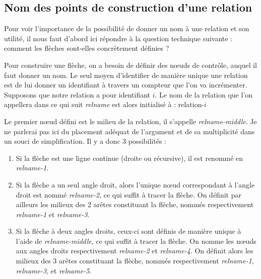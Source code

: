 \documentclass[a4paper,11pt]{report}
\newcommand{\inputTikZ}[1]{%
  }%
\newcommand{\inputTikZ}[1]{%
    \texttt{[image: fig/\#1.pdf]}%
  }%
\begin{document}
\subsection{Nom des points de construction d'une relation}\label{ss.relptname}

Pour voir l'importance de la possibilité de donner un nom à une relation et son utilité, il nous faut d'abord ici répondre à la question technique suivante : comment les flèches sont-elles concrètement définies ?

Pour construire une flèche, on a besoin de définir des n\oe{}uds de contrôle, auquel il faut donner un nom. Le seul moyen d'identifier de manière unique une relation est de lui donner un identifiant à travers un compteur que l'on va incrémenter. Supposons que notre relation a pour identifiant $i$. Le nom de la relation que l'on appellera dans ce qui suit {\it relname} est alors initialisé à : relation-$i$

Le premier n\oe{}ud défini est le milieu de la relation, il s'appelle {\it relname-middle}. Je ne parlerai pas ici du placement adéquat de l'argument et de sa multiplicité dans un souci de simplification. Il y a donc 3 possibilités :

\begin{enumerate}
\item Si la flèche est une ligne continue (droite ou récursive), il est renommé en {\it relname-1}.

\begin{center}
\inputTikZ{relationptname}
\end{center}

\item Si la flèche a un seul angle droit, alors l'unique n\oe{}ud correspondant à l'angle droit est nommé {\it relname-2}, ce qui suffit à tracer la flèche. On définit par ailleurs les milieux des 2 arêtes constituant la flèche, nommés respectivement {\it relname-1} et {\it relname-3}.

\begin{center}
\inputTikZ{relationHVptname}
\end{center}

\item Si la flèche à deux angles droits, ceux-ci sont définis de manière unique à l'aide de {\it relname-middle}, ce qui suffit à tracer la flèche. On nomme les n\oe{}uds aux angles droits respectivement {\it relname-2} et {\it relname-4}. On définit alors les milieux des 3 arêtes constituant la flèche, nommés respectivement {\it relname-1}, {\it relname-3}, et {\it relname-5}.

\begin{center}
\inputTikZ{relationHVHptname}
\end{center}
\end{enumerate}
\end{document}
